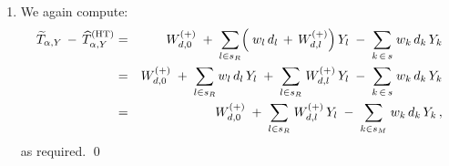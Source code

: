\begin{enumerate}
\begin{eqnarray*}
            \overset{J}{\underset{j=1}{\sum}}\;
            \underset{k \in s_{M}^{(j)}}{\sum}\;
            w_{k}\,d_{k}\,\varphi^{(j)}_{0k}
            \,\right)
        \,+\,
        \left(\;
            \underset{l \in s_{R}}{\sum}\;w_{l}\,d_{l}\,Y_{l}
            \,+\,
            \underset{l \in s_{R}}{\sum}\!\left(\;
                \overset{J}{\underset{j=1}{\sum}}\;
                \underset{k \in s_{M}^{(j)}}{\sum}\,w_{k}\,d_{k}\,\varphi^{(j)}_{lk}
                \right)
            Y_{l}
            \right)
    \\
    & = &
        \left(\;
            \overset{J}{\underset{j=1}{\sum}}\;
            \underset{k \in s_{M}^{(j)}}{\sum}\;
            w_{k}\,d_{k}\,\varphi^{(j)}_{0k}
            \,\right)
        \,+\,
        \underset{l \in s_{R}}{\sum}
        \left(\;
            w_{l}\,d_{l}
            \,+\,
            \left(\;
                \overset{J}{\underset{j=1}{\sum}}\;
                \underset{k \in s_{M}^{(j)}}{\sum}\,w_{k}\,d_{k}\,\varphi^{(j)}_{lk}
                \right)
            \right)
        Y_{l}
    \\
    & \overset{{\color{white}\textnormal{\LARGE$1$}}}{=} &
        W^{(+)}_{d,0}
        \;+\;
        \underset{l \in s_{R}}{\sum}\left(\,w_{l}d_{l} \,+\, W^{(+)}_{d,l}\,\right)Y_{l}
    \end{eqnarray*}
\item
    We again compute:
    \begin{eqnarray*}
    \widetilde{T}_{\alpha,Y}
    \,-\,
    \widehat{T}^{\textnormal{(HT)}}_{\alpha,Y}
    & = &
        W^{(+)}_{d,0}
        \;+\;
        \underset{l \in s_{R}}{\sum}\!
        \left(\;
            w_{l}\,d_{l}
            \,+\,
            W^{(+)}_{d,l}
            \right)
        Y_{l}
        \;-\;
        \underset{k\,\in\,s}{\sum}\;w_{k}\,d_{k}\,Y_{k}
    \\
    & = &
        W^{(+)}_{d,0}
        \;+\;
        \underset{l \in s_{R}}{\sum}\,w_{l}\,d_{l}\,Y_{l}
        \;+\;
        \underset{l \in s_{R}}{\sum}\;W^{(+)}_{d,l}\,Y_{l}
        \;-\;
        \underset{k\,\in\,s}{\sum}\;w_{k}\,d_{k}\,Y_{k}
    \\
    & = &
        W^{(+)}_{d,0}
        \;+\;
        \underset{l \in s_{R}}{\sum}\;W^{(+)}_{d,l}\,Y_{l}
        \;-\;
        \underset{k \in s_{M}}{\sum}\;w_{k}\,d_{k}\,Y_{k}\,,
    \end{eqnarray*}
    as required.
    \qed
\end{enumerate}


